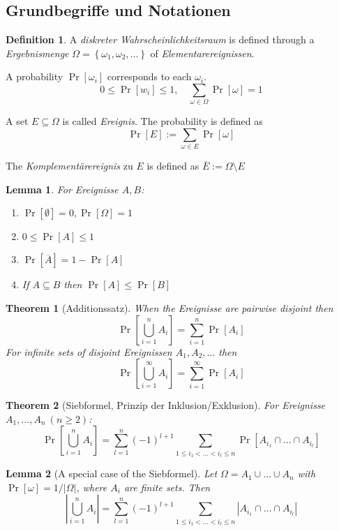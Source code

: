 \documentclass[12pt]{extarticle}
\theoremstyle{definition}
\newtheorem{definition}{Definition}
\theoremstyle{remark}
\theoremstyle{plain}
\newtheorem{theorem}{Theorem}
\theoremstyle{plain}
\newtheorem{lemma}{Lemma}
\theoremstyle{plain}
\begin{document}
\subsection{Grundbegriffe und Notationen}

\begin{definition}
    A \textit{diskreter Wahrscheinlichkeitsraum} is defined through a \textit{Ergebnismenge}
    $\Omega = \left\{ \omega_1, \omega_2, ... \right\}$ of \textit{Elementarereignissen}.

    A probability $\Pr[\omega_i]$ corresponds to each $\omega_i$.
    \[0 \le \Pr[w_i] \le 1,\quad \sum_{\omega \in \Omega} \Pr[\omega] = 1\]

    A set $E \subseteq \Omega$ is called \textit{Ereignis}. The probability is defined as
    \[ \Pr[E] := \sum_{\omega \in E} \Pr[\omega] \]

    The \textit{Komplementärereignis} zu $E$ is defined as $\overline{E} := \Omega \setminus E$
\end{definition}

\begin{lemma}
    For \textit{Ereignisse} $A,B$:
    \begin{enumerate}
        \item $\Pr[\emptyset] = 0, \Pr[\Omega] = 1$
        \item $0 \le \Pr[A] \le 1$
        \item $\Pr[\overline{A}] = 1 - \Pr[A]$
        \item If $A \subseteq B$ then $\Pr[A] \le \Pr[B]$
    \end{enumerate}
\end{lemma}

\begin{theorem}[Additionssatz]
    When the \textit{Ereignisse} are pairwise disjoint then
    \[ \Pr \left[ \bigcup_{i=1}^n A_i \right] = \sum_{i=1}^n \Pr[A_i] \]
    For infinite sets of disjoint Ereignissen $A_1, A_2, ...$ then
    \[ \Pr \left[ \bigcup_{i=1}^\infty A_i \right] = \sum_{i=1}^\infty \Pr[A_i] \]
\end{theorem}

\begin{theorem}[Siebformel, Prinzip der Inklusion/Exklusion]
    For Ereignisse $A_1, ..., A_n \ (n \ge 2)$:
    \[ \Pr \left[ \bigcup_{i=1}^n A_i \right] = \sum_{l=1}^n (-1)^{l+1} \sum_{1 \le i_1 < ... < i_l \le n} \Pr[A_{i_1} \cap ... \cap A_{i_l}] \]
\end{theorem}

\begin{lemma}[A special case of the Siebformel]
    Let $\Omega = A_1 \cup ... \cup A_n$ with $\Pr[\omega] = 1/|\Omega|$,
    where $A_i$ are finite sets.
    Then
    \[ | \bigcup_{i=1}^n A_i | = \sum_{l=1}^n (-1)^{l+1} \sum_{1 \le i_1 < ... < i_l \le n} |A_{i_1} \cap ... \cap A_{i_l}| \]
\end{lemma}
\end{document}
